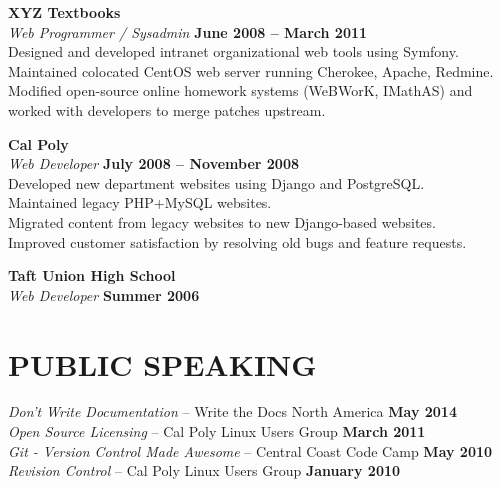 \documentclass[margin,line]{resume}
\begin{document}
\begin{resume}
    \textbf{\listing XYZ Textbooks} \vspace{2mm}\\\vspace{1mm}%
    \textsl{Web Programmer / Sysadmin} \hfill \textbf{June 2008 -- March 2011}\\
    Designed and developed intranet organizational web tools using Symfony.\\
    Maintained colocated CentOS web server running Cherokee, Apache, Redmine.\\
    Modified open-source online homework systems (WeBWorK, IMathAS) and worked with developers to merge patches upstream.
    
    \textbf{\listing Cal Poly} \vspace{2mm}\\\vspace{1mm}%
    \textsl{Web Developer} \hfill \textbf{July 2008 -- November 2008}\\
    Developed new department websites using Django and PostgreSQL.\\
    Maintained legacy PHP+MySQL websites.\\
    Migrated content from legacy websites to new Django-based websites.\\
    Improved customer satisfaction by resolving old bugs and feature requests.

    \textbf{\listing Taft Union High School} \vspace{2mm}\\\vspace{1mm}%
    \textsl{Web Developer} \hfill \textbf{Summer 2006}\\

\sectionline

    \section{\mysidestyle \textbf{\large{P}\small{UBLIC SPEAKING}}}

    \textsl{Don't Write Documentation} -- Write the Docs North America \hfill \textbf{May 2014}\\
    \textsl{Open Source Licensing} -- Cal Poly Linux Users Group \hfill \textbf{March 2011}\\
    \textsl{Git - Version Control Made Awesome} -- Central Coast Code Camp \hfill \textbf{May 2010}\\
    \textsl{Revision Control} -- Cal Poly Linux Users Group \hfill \textbf{January 2010}\\


\end{resume}
\end{document}
